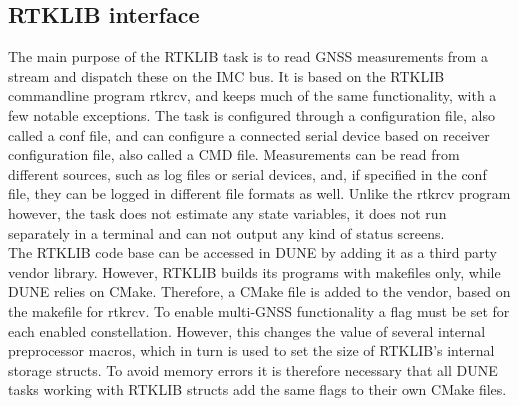 \subsection{RTKLIB interface}
    The main purpose of the RTKLIB task is to read GNSS measurements from a stream and dispatch these on the IMC bus. It is based on the RTKLIB commandline program rtkrcv, and keeps much of the same functionality, with a few notable exceptions. The task is configured through a configuration file, also called a conf file, and can configure a connected serial device based on receiver configuration file, also called a CMD file. Measurements can be read from different sources, such as log files or serial devices, and, if specified in the conf file, they can be logged in different file formats as well. Unlike the rtkrcv program however, the task does not estimate any state variables, it does not run separately in a terminal and can not output any kind of status screens.\\
    
    The RTKLIB code base can be accessed in DUNE by adding it as a third party vendor library. However, RTKLIB builds its programs with makefiles only, while DUNE relies on CMake. Therefore, a CMake file is added to the vendor, based on the makefile for rtkrcv. To enable multi-GNSS functionality a flag must be set for each enabled constellation. However, this changes the value of several internal preprocessor macros, which in turn is used to set the size of RTKLIB's internal storage structs. To avoid memory errors it is therefore necessary that all DUNE tasks working with RTKLIB structs add the same flags to their own CMake files.\\
    
